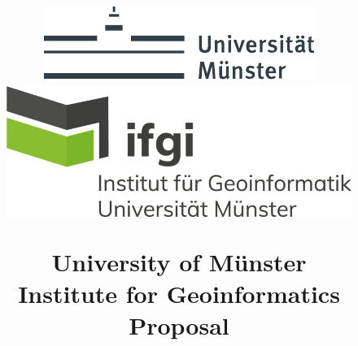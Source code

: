\documentclass[a4paper,11pt,pdftex, parskip]{scrreprt}
\begin{document}
\begin{titlepage}
   
            \title{
            \begin{figure}[t]
            \centering
            \includegraphics[scale = 1, keepaspectratio]{Logos/unims.pdf}
            \hspace{1cm}
            \includegraphics[scale = 0.9, keepaspectratio]{Logos/ifgi_logo.png}
            \end{figure}
            \textnormal{ 
            \normalsize \Large 
            University of Münster \\ Institute for Geoinformatics\\
            \vspace{3cm}
                Proposal \\}
            \grqq 
            \vspace{1,5cm}}



\end{titlepage}
\end{document}
